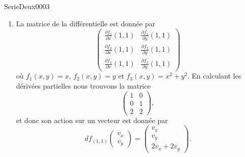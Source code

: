 \begin{corrige}{SerieDeux0003}
\begin{enumerate}
		\item
			La matrice de la différentielle est donnée par
			\begin{equation}
				\begin{pmatrix}
					\frac{ \partial f_1 }{ \partial x }(1,1)	&	\frac{ \partial f_1 }{ \partial y }	(1,1)\\
					\frac{ \partial f_2 }{ \partial x }(1,1)	&	\frac{ \partial f_2 }{ \partial y }(1,1)	\\
					\frac{ \partial f_3 }{ \partial x }(1,1)	&	\frac{ \partial f_3 }{ \partial y }(1,1)	
				\end{pmatrix}
			\end{equation}
			où $f_1(x,y)=x$, $f_2(x,y)=y$ et $f_3(x,y)=x^2+y^2$. En calculant les dérivées partielles nous trouvons la matrice
			\begin{equation}
				\begin{pmatrix}
					1	&	0	\\
					0	&	1	\\
					2	&	2	
				\end{pmatrix},
			\end{equation}
			et donc son action sur un vecteur est donnée par
			\begin{equation}			\label{EqActionDiffddeuxtrois}
				df_{(1,1)}\begin{pmatrix}
					v_x	\\ 
					v_y	
				\end{pmatrix}
				=
				\begin{pmatrix}
					v_x	\\ 
					v_y	\\ 
					2v_x+2v_y	
				\end{pmatrix}.
			\end{equation}
			

	\end{enumerate}

\end{corrige}
